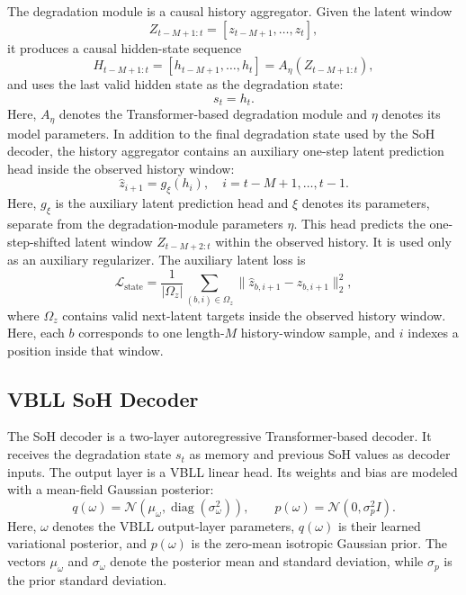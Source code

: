\documentclass[conference]{IEEEtran}
\begin{document}
The degradation module is a causal history aggregator. Given the latent
window
\begin{equation}
Z_{t-M+1:t} = [z_{t-M+1}, \ldots, z_t],
\end{equation}
it produces a causal hidden-state sequence
\begin{equation}
H_{t-M+1:t}
=
[h_{t-M+1}, \ldots, h_t]
=
A_{\eta}(Z_{t-M+1:t}),
\end{equation}
and uses the last valid hidden state as the degradation state:
\begin{equation}
s_t = h_t .
\end{equation}
Here, $A_{\eta}$ denotes the Transformer-based degradation module and $\eta$
denotes its model parameters. In addition to the final degradation state used by
the SoH decoder, the history aggregator contains an auxiliary one-step latent
prediction head inside the observed history window:
\begin{equation}
\hat z_{i+1}=g_{\xi}(h_i),
\quad i=t-M+1,\ldots,t-1 .
\end{equation}
Here, $g_{\xi}$ is the auxiliary latent prediction head and $\xi$ denotes its
parameters, separate from the degradation-module parameters $\eta$. This head
predicts the one-step-shifted latent window $Z_{t-M+2:t}$ within the observed
history. It is used only as an auxiliary regularizer.
The auxiliary latent loss is
\begin{equation}
\mathcal{L}_{\mathrm{state}}
=
\frac{1}{|\Omega_z|}
\sum_{(b,i)\in\Omega_z}
\|\hat z_{b,i+1}-z_{b,i+1}\|_2^2,
\end{equation}
where $\Omega_z$ contains valid next-latent targets inside the observed history
window. Here, each $b$ corresponds to one length-$M$ history-window sample, and
$i$ indexes a position inside that window.

\subsection{VBLL SoH Decoder}

The SoH decoder is a two-layer autoregressive Transformer-based decoder. It
receives the degradation state $s_t$ as memory and previous SoH values as
decoder inputs. The output layer is a VBLL linear head. Its weights and bias are
modeled with a mean-field Gaussian posterior:
\begin{equation}
q(\omega)=\mathcal{N}(\mu_{\omega},\operatorname{diag}(\sigma_{\omega}^2)),
\qquad
p(\omega)=\mathcal{N}(0,\sigma_p^2 I).
\end{equation}
Here, $\omega$ denotes the VBLL output-layer parameters, $q(\omega)$ is their
learned variational posterior, and $p(\omega)$ is the zero-mean isotropic
Gaussian prior. The vectors $\mu_{\omega}$ and $\sigma_{\omega}$ denote the
posterior mean and standard deviation, while $\sigma_p$ is the prior standard
deviation.
\end{document}
